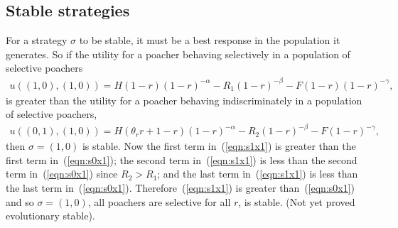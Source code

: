 \documentclass[10pt]{article}
\begin{document}
\subsection{Stable strategies}

For a strategy $\sigma$ to be stable, it must be a best response in the population it generates. So if the utility for a poacher behaving selectively in a population of selective poachers
\begin{eqnarray}
\label{eqn:s1x1}
 u((1,0),(1,0)) = H(1-r)(1-r)^{-\alpha} - R_1(1-r)^{-\beta} - F(1-r)(1-r)^{-\gamma},
\end{eqnarray}
is greater than the utility for a poacher behaving indiscriminately in a population of selective poachers,
\begin{eqnarray}
\label{eqn:s0x1}
u((0,1),(1,0)) = H(\theta_r r +1 -r)(1-r)^{-\alpha} - R_2(1-r)^{-\beta} - F(1-r)^{-\gamma},
\end{eqnarray} 
then $\sigma = (1,0)$ is stable. Now the first term in~(\ref{eqn:s1x1}) is greater than the first term in~(\ref{eqn:s0x1}); the second term in~(\ref{eqn:s1x1}) is less than the second term in~(\ref{eqn:s0x1}) since $R_2 > R_1$; and the last term in~(\ref{eqn:s1x1}) is less than the last term in~(\ref{eqn:s0x1}). Therefore~(\ref{eqn:s1x1}) is greater than~(\ref{eqn:s0x1}) and so $\sigma = (1,0)$, all poachers are selective for all $r$, is stable. (Not yet proved evolutionary stable). 
\end{document}
